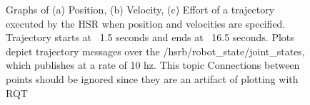 \documentclass[12pt]{article}
\begin{document}
        \begin{figure}
            \centering
            \quad
            \caption{Graphs of (a) Position, (b) Velocity, (c) Effort of a trajectory executed by the HSR when position and velocities are specified. Trajectory starts at ~1.5 seconds and ends at ~16.5 seconds. Plots depict trajectory messages over the /hsrb/robot\_state/joint\_states, which publishes at a rate of 10 hz. This topic Connections between points should be ignored since they are an artifact of plotting with RQT}
            \label{fig:first analysis}
        \end{figure}
\end{document}
